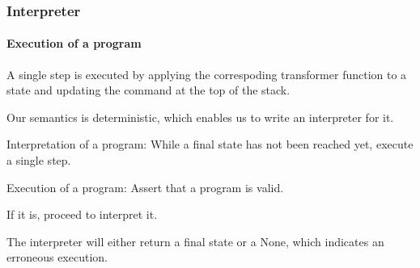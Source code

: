 \begin{frame}
\frametitle{Interpreter}
\framesubtitle{Execution of a program}

A single step is executed by applying the correspoding transformer function to a state and updating the command at the top of the stack.
\bigskip
\pause

Our semantics is deterministic, which enables us to write an interpreter for it.
\bigskip
\pause

\begin{block}{Interpretation of a program:}
While a final state has not been reached yet, execute a single step.
\end{block}

\pause

\begin{block}{Execution of a program:}
Assert that a program is valid.

If it is, proceed to interpret it.
\end{block}

\bigskip

The interpreter will either return a final state or a None, which indicates an erroneous execution.

\end{frame}
